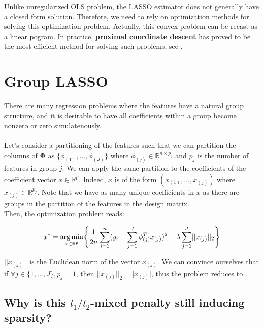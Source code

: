 \documentclass[a4paper,10pt]{article}
\theoremstyle{definition}
\begin{document}
Unlike unregularized OLS problem, the LASSO estimator does not generally have a closed form solution. Therefore, we need to rely on optimization methods for solving this optimization problem. Actually, this convex problem
can be recast as a linear pogram. In practice, \textbf{proximal coordinate descent} has proved to be the most efficient method for solving such problems, see \cite{Bertrand_Massias_Anderson}.

\section{Group LASSO}
\label{section_2}

There are many regression problems where the features have a natural group structure, and it is desirable to have all coefficients within a group become nonzero or zero simulatenously.
\\
\\
Let's consider a partitioning of the features such that we can partition the columns of $\mathbf{\Phi}$ as $\{\phi_{(1)}, ..., \phi_{(J)}\}$ where $\phi_{(j)} \in \mathbb{R}^{n \times p_j}$ and
$p_j$ is the number of features in group $j$. We can apply the same partition to the coefficients of the coefficient vector $x \in \mathbb{R}^p$. Indeed, $x$ is of the form $(x_{(1)}, ..., x_{(j)})$ where
$x_{(j)} \in \mathbb{R}^{p_j}$. Note that we have as many unique coefficients in $x$ as there are groups in the partition of the features in the design matrix.
\\

Then, the optimization problem reads:

\begin{equation*}
    x^* = \operatorname*{arg\,min}_{x \in \mathbb{R}^p} \Biggl\{ \frac{1}{2n} \sum_{i=1}^n (y_i - \sum_{j=1}^J \phi_{(j)}^T x_{(j)})^2 + \lambda \sum_{j=1}^{J} \lvert\lvert x_{(j)} \rvert\rvert_2 \Biggr\}
\end{equation*}

$\lvert\lvert x_{(j)} \rvert\rvert$ is the Euclidean norm of the vector $x_{(j)}$. We can convince ourselves that if $\forall j \in \{1, ..., J\}, p_j = 1$, then $\lvert\lvert x_{(j)} \rvert\rvert_2 = \lvert x_{(j)} \rvert$,
thus the problem reduces to .

\subsection*{Why is this $l_1 / l_2$-mixed penalty still inducing sparsity?}
\end{document}
